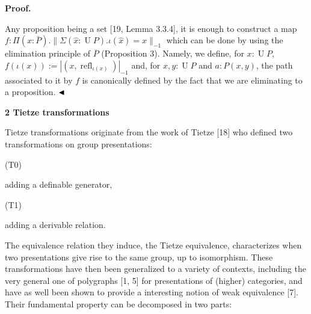  
 
 
 
\par\medskip\noindent\textbf{Proof.}\par
 
 
Any proposition being a set [19, Lemma 3.3.4], it is enough to construct a map $f:\Pi(x:\overline{P}).\|\Sigma(\hat{x}:\operatorname{U}P).\iota(\hat{x})=x\|_{-1}$ which can be done by using the elimination principle of $\overline{P}$ (Proposition 3). Namely, we define, for $x:\operatorname{U}P$, $f(\iota(x)):=|(x,\operatorname{refl}_{\iota(x)})|_{-1}$ and, for $x,y:\operatorname{U}P$ and $a:P(x,y)$, the path associated to it by $f$ is canonically defined by the fact that we are eliminating to a proposition. $\hfill\blacktriangleleft$\par
 
 
 
 


 
\par\medskip\noindent\textbf{2 Tietze transformations}\par
 
 
Tietze transformations originate from the work of Tietze [18] who defined two transformations on group presentations:\par
  (T0)  
 
adding a definable generator,\par
 
  (T1)  
 
adding a derivable relation.\par
 
   
The equivalence relation they induce, the Tietze equivalence, characterizes when two presentations give rise to the same group, up to isomorphism. These transformations have then been generalized to a variety of contexts, including the very general one of polygraphs [1, 5] for presentations of (higher) categories, and have as well been shown to provide a interesting notion of weak equivalence [7]. Their fundamental property can be decomposed in two parts:\par
  
